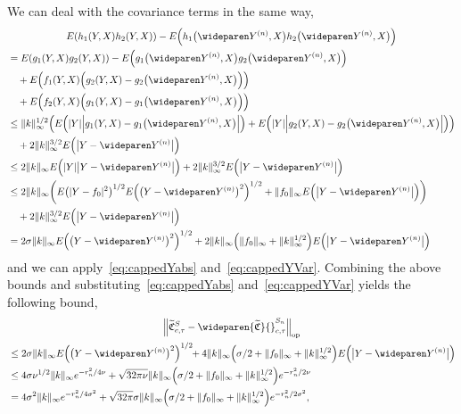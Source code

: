 \documentclass[10pt]{amsart}
\theoremstyle{definition}\newtheorem{defi}[theo]{Definition}\newtheorem{rema}[theo]{Remark}\newtheorem{exam}[theo]{Example}\newtheorem{exem}[theo]{Example}\newtheorem{nota}[theo]{Notation}
\theoremstyle{remark}
\DeclareMathOperator{\opp}{op}
\newcommand{\fkC}{\mathfrak{C}}
\newcommand{\Cov}{\tilde{\fkC}}
\newcommand{\CovCapntau}{\wideparen{\widetilde{\fkC}}{\vphantom{\fkC}}^{S_n}_{c,\tau}}
\let\oldtilde\tilde
\renewcommand*{\tilde}[1]{\mathchoice{\widetilde{#1}}{\widetilde{#1}}{\oldtilde{#1}}{\oldtilde{#1}}}
\let\originalleft\left
\let\originalright\right
\renewcommand{\left}{\mathopen{}\mathclose\bgroup\originalleft}
\renewcommand{\right}{\aftergroup\egroup\originalright}
\begin{document}
We can deal with the covariance terms in the same way,
\begin{multline*}
E(h_1(Y,X) h_2(Y,X)) - E\left(h_1\bigl(\wideparen Y^{(n)},X\bigr) h_2\bigl(\wideparen Y^{(n)},X\bigr)\right) \\
\begin{aligned}
&= E(g_1(Y,X) g_2(Y,X)) - E\left(g_1\bigl(\wideparen Y^{(n)},X\bigr) g_2\bigl(\wideparen Y^{(n)},X\bigr)\right) \\
&\quad + E\left(f_1(Y,X) \left(g_2(Y,X) - g_2\bigl(\wideparen Y^{(n)},X\bigr)\right)\right) \\
&\quad + E\left(f_2(Y,X) \left(g_1(Y,X) - g_1\bigl(\wideparen Y^{(n)},X\bigr)\right)\right) \\
& \leq \|k\|_\infty^{1/2} \left(E\left(|Y| \left|g_1(Y,X) - g_1\bigl(\wideparen Y^{(n)},X\bigr)\right|\right) + E\left(|Y| \left|g_2(Y,X) - g_2\bigl(\wideparen Y^{(n)},X\bigr)\right|\right)\right)
\\
&\quad + 2 \|k\|^{3/2}_\infty E\left(\bigl|Y - \wideparen Y^{(n)}\bigr|\right) \\
& \leq 2 \|k\|_\infty E\left(|Y| \bigl|Y - \wideparen Y^{(n)}\bigr|\right) + 2 \|k\|^{3/2}_\infty E\left(\bigl|Y - \wideparen Y^{(n)}\bigr|\right) \\
&\leq 2 \|k\|_\infty \left(E\left(|Y - f_0|^2\right)^{1/2} E\left(\bigl(Y - \wideparen Y^{(n)}\bigr)^2\right)^{1/2} + \|f_0\|_\infty E\left(\bigl|Y - \wideparen Y^{(n)}\bigr|\right)\right) \\
&\quad + 2 \|k\|^{3/2}_\infty E\left(\bigl|Y - \wideparen Y^{(n)}\bigr|\right) \\
&=2 \sigma \|k\|_\infty E\left(\bigl(Y - \wideparen Y^{(n)}\bigr)^2\right)^{1/2} + 2 \|k\|_\infty \left(\|f_0\|_\infty + \|k\|_\infty^{1/2}\right) E\left(\bigl|Y - \wideparen Y^{(n)}\bigr|\right)
\end{aligned}
\end{multline*}
and we can apply~\eqref{eq:cappedYabs} and~\eqref{eq:cappedYVar}. Combining the above bounds and substituting~\eqref{eq:cappedYabs} and~\eqref{eq:cappedYVar} yields the following bound,
\begin{multline}\label{eq:direct_sum_cov}
\left\|\Cov_{c,\tau}^S - \CovCapntau\right\|_{\opp}\\
\begin{aligned}
&\leq 2 \sigma \|k\|_\infty E\left(\bigl(Y - \wideparen Y^{(n)}\bigr)^2\right)^{1/2} \!\! + 4 \|k\|_\infty \left(\sigma/2 + \|f_0\|_\infty + \|k\|_\infty^{1/2}\right) E\left(\bigl|Y - \wideparen Y^{(n)}\bigr|\right)\\
&\leq 4 \sigma \nu^{1/2} \|k\|_\infty e^{-r_n^2/4\nu} + \sqrt{32\pi\nu} \|k\|_\infty \left(\sigma/2 + \|f_0\|_\infty + \|k\|_\infty^{1/2}\right) e^{-r_n^2/2\nu}\\
&= 4 \sigma^2 \|k\|_\infty e^{-r_n^2/4\sigma^2} + \sqrt{32\pi} \sigma \|k\|_\infty \left(\sigma/2 + \|f_0\|_\infty + \|k\|_\infty^{1/2}\right) e^{-r_n^2/2\sigma^2},
\end{aligned}
\end{multline}
\end{document}
